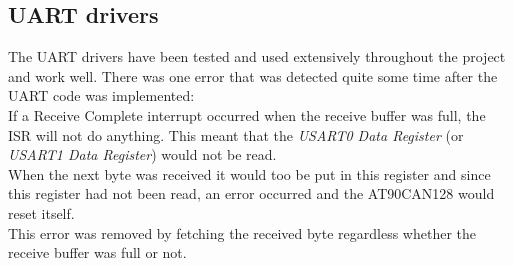 \subsection{UART drivers}\label{sec:result_uart}
The UART drivers have been tested and used extensively throughout the project and work well. There was one error that was detected quite some time after the UART code was implemented: \\
If a Receive Complete interrupt occurred when the receive buffer was full, the ISR will not do anything. This meant that the \emph{USART0 Data Register} (or \emph{USART1 Data Register}) would not be read. \\
When the next byte was received it would too be put in this register and since this register had not been read, an error occurred and the AT90CAN128 would reset itself. \\
This error was removed by fetching the received byte regardless whether the receive buffer was full or not.